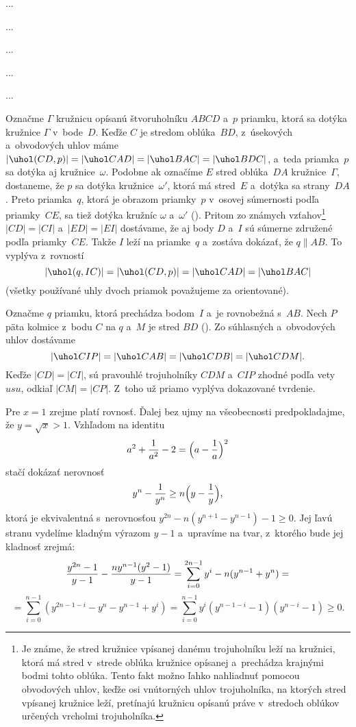 {%
...}

{%
...}

{%
...}

{%
...}

{%
...}

{%
Označme $\Gamma$ kružnicu opísanú štvoruholníku $ABCD$  a~$p$ priamku, ktorá sa dotýka kružnice $\Gamma$ v~bode~$D$. Keďže $C$ je stredom oblúka~$BD$, z~úsekových a~obvodových uhlov máme $|\uhol(CD,p)|=|\uhol CAD|=|\uhol BAC|=|\uhol BDC|$, a~teda priamka~$p$ sa dotýka aj kružnice~$\omega$. Podobne ak označíme $E$
stred oblúka~$DA$ kružnice~$\Gamma$, dostaneme, že $p$ sa dotýka kružnice~$\omega'$, ktorá má stred~$E$ a~dotýka sa strany~$DA$. Preto priamka~$q$, ktorá je obrazom priamky~$p$ v~osovej súmernosti podľa priamky~$CE$, sa tiež dotýka kružníc $\omega$ a~$\omega'$ (\obr). Pritom zo známych vzťahov\footnote{Je známe, že stred kružnice vpísanej danému trojuholníku leží na kružnici, ktorá má stred v~strede oblúka kružnice opísanej a~prechádza krajnými bodmi tohto oblúka. Tento fakt možno ľahko nahliadnuť pomocou obvodových uhlov, keďže osi vnútorných uhlov trojuholníka, na ktorých stred vpísanej kružnice leží, pretínajú kružnicu opísanú práve v~stredoch oblúkov určených vrcholmi trojuholníka.} $|CD|=|CI|$ a~$|ED|=|EI|$ dostávame, že aj body $D$ a~$I$ sú súmerne združené podľa priamky~$CE$. Takže $I$ leží na priamke~$q$ a~zostáva dokázať, že $q\parallel AB$. To vyplýva z~rovností
$$
|\uhol(q,IC)|=|\uhol(CD,p)|=|\uhol CAD|=|\uhol BAC|
$$
(všetky používané uhly dvoch priamok považujeme za orientované).
%

\ineriesenie
Označme $q$ priamku, ktorá prechádza bodom~$I$ a~je rovnobežná s~$AB$. Nech $P$ päta kolmice z~bodu $C$ na $q$ a~$M$ je stred $BD$ (\obr). Zo súhlasných a~obvodových uhlov dostávame
$$
|\uhol CIP| = |\uhol CAB| = |\uhol CDB| = |\uhol CDM|.
$$
Keďže $|CD|=|CI|$, sú pravouhlé trojuholníky $CDM$ a~$CIP$ zhodné podľa vety $usu$, odkiaľ $|CM| = |CP|$. Z~toho už priamo vyplýva dokazované tvrdenie.
%
}

{%
Pre $x=1$ zrejme platí rovnosť. Ďalej bez ujmy na všeobecnosti predpokladajme, že $y=\sqrt{x}>1$.
Vzhľadom na identitu
$$
a^2+{1\over a^2}-2=\Bigl(a-{1\over a}\Bigr)^2
$$
stačí dokázať nerovnosť
$$
y^n-{1\over y^n}\ge n\Bigl(y-{1\over y}\Bigr),
$$
ktorá je ekvivalentná s~nerovnosťou $y^{2n}-n(y^{n+1}-y^{n-1})-1\ge 0$. Jej ľavú stranu vydelíme kladným výrazom $y-1$ a~upravíme na tvar, z~ktorého bude jej kladnosť zrejmá:
$${y^{2n}-1\over y-1}-{ny^{n-1}(y^2-1)\over y-1}=
\sum_{i=0}^{2n-1}y^i-n(y^{n-1}+y^n)=$$
$$=\sum_{i=0}^{n-1}(y^{2n-1-i}-y^n-y^{n-1}+y^i)=
\sum_{i=0}^{n-1}y^i(y^{n-1-i}-1)(y^{n-i}-1)\ge 0.$$
}

